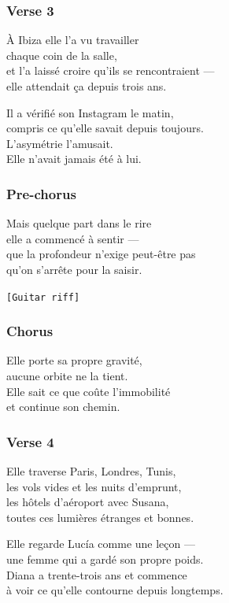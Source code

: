 \documentclass[]{article}
\begin{document}
\subsubsection{Verse 3}\label{verse-3-2}

À Ibiza elle l'a vu travailler\\
chaque coin de la salle,\\
et l'a laissé croire qu'ils se rencontraient ---\\
elle attendait ça depuis trois ans.

Il a vérifié son Instagram le matin,\\
compris ce qu'elle savait depuis toujours.\\
L'asymétrie l'amusait.\\
Elle n'avait jamais été à lui.

\subsubsection{Pre-chorus}\label{pre-chorus-3}

Mais quelque part dans le rire\\
elle a commencé à sentir ---\\
que la profondeur n'exige peut-être pas\\
qu'on s'arrête pour la saisir.

\texttt{{[}Guitar\ riff{]}}

\subsubsection{Chorus}\label{chorus-9}

Elle porte sa propre gravité,\\
aucune orbite ne la tient.\\
Elle sait ce que coûte l'immobilité\\
et continue son chemin.

\subsubsection{Verse 4}\label{verse-4-2}

Elle traverse Paris, Londres, Tunis,\\
les vols vides et les nuits d'emprunt,\\
les hôtels d'aéroport avec Susana,\\
toutes ces lumières étranges et bonnes.

Elle regarde Lucía comme une leçon ---\\
une femme qui a gardé son propre poids.\\
Diana a trente-trois ans et commence\\
à voir ce qu'elle contourne depuis longtemps.
\end{document}
